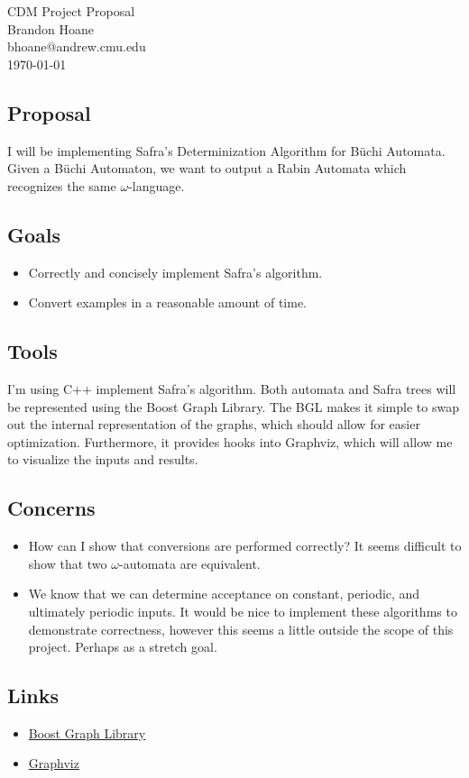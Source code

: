 \documentclass[11pt]{article}
\makeatletter
\newcommand{\myname}{Brandon Hoane}
\newcommand{\myandrew}{bhoane@andrew.cmu.edu}
\makeatother
\begin{document}
\medskip                        %

\thispagestyle{plain}
\begin{center}                  %
{\Large CDM Project Proposal} \\
\myname \\
\myandrew \\
\today \\
\end{center}

\subsection*{Proposal}
I will be implementing Safra's Determinization Algorithm for
B\"uchi Automata. Given a B\"uchi Automaton, we want to output a
Rabin Automata which recognizes the same $\omega$-language.

\subsection*{Goals}
\begin{itemize}
\item Correctly and concisely implement Safra's algorithm.
\item Convert examples in a reasonable amount of time.
\end{itemize}

\subsection*{Tools}
I'm using C++ implement Safra's algorithm.
Both automata and Safra trees will be represented using the Boost Graph Library.
The BGL makes it simple to swap out the internal representation of the graphs,
which should allow for easier optimization.
Furthermore, it provides hooks into Graphviz, which will allow
me to visualize the inputs and results.

\subsection*{Concerns}
\begin{itemize}
\item How can I show that conversions are performed correctly?
  It seems difficult to show that two $\omega$-automata are equivalent.
\item
  We know that we can determine acceptance on
  constant, periodic, and ultimately periodic inputs.
  It would be nice to implement these algorithms to
  demonstrate correctness, however this seems a little
  outside the scope of this project.
  Perhaps as a stretch goal.
\end{itemize}

\subsection*{Links}
\begin{itemize}
\item \href{http://www.boost.org/doc/libs/1_57_0/libs/graph/doc/}
  {Boost Graph Library}
\item \href{http://www.graphviz.org/}{Graphviz}
\end{itemize}
\end{document}
